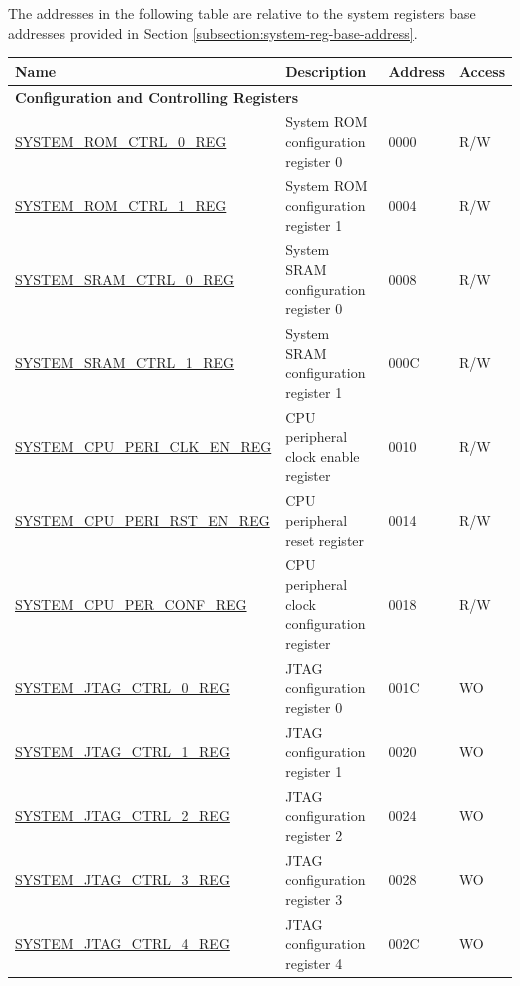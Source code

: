 The addresses in the following table are relative to the system registers base addresses provided in Section \ref{subsection:system-reg-base-address}.

\begin{longtable}{ | p{6.5cm} | p{7.5cm} | p{1.3cm} | p{1cm} | }
\hline\rowcolor{lightgray}
Name & Description &  Address & Access \\ \hline
\endhead
\multicolumn{4}{|l|}{\textbf{Configuration and Controlling Registers}} \\ \hline
\hyperref[regdesc:SYSTEMROMCTRL0REG]{SYSTEM\_ROM\_CTRL\_0\_REG} & System ROM configuration register 0 & \hexprefix{}0000 & R/W \\ \hline
\hyperref[regdesc:SYSTEMROMCTRL1REG]{SYSTEM\_ROM\_CTRL\_1\_REG} & System ROM configuration register 1 & \hexprefix{}0004 & R/W \\ \hline
\hyperref[regdesc:SYSTEMSRAMCTRL0REG]{SYSTEM\_SRAM\_CTRL\_0\_REG} & System SRAM configuration register 0 & \hexprefix{}0008 & R/W \\ \hline
\hyperref[regdesc:SYSTEMSRAMCTRL1REG]{SYSTEM\_SRAM\_CTRL\_1\_REG} & System SRAM configuration register 1 & \hexprefix{}000C & R/W \\ \hline
\hyperref[regdesc:SYSTEMCPUPERICLKENREG]{SYSTEM\_CPU\_PERI\_CLK\_EN\_REG} & CPU peripheral clock enable register & \hexprefix{}0010 & R/W \\ \hline
\hyperref[regdesc:SYSTEMCPUPERIRSTENREG]{SYSTEM\_CPU\_PERI\_RST\_EN\_REG} & CPU peripheral reset register & \hexprefix{}0014 & R/W \\ \hline
\hyperref[regdesc:SYSTEMCPUPERCONFREG]{SYSTEM\_CPU\_PER\_CONF\_REG} & CPU peripheral clock configuration register & \hexprefix{}0018 & R/W \\ \hline
\hyperref[regdesc:SYSTEMJTAGCTRL0REG]{SYSTEM\_JTAG\_CTRL\_0\_REG} & JTAG configuration register 0 & \hexprefix{}001C & WO \\ \hline
\hyperref[regdesc:SYSTEMJTAGCTRL1REG]{SYSTEM\_JTAG\_CTRL\_1\_REG} & JTAG configuration register 1 & \hexprefix{}0020 & WO \\ \hline
\hyperref[regdesc:SYSTEMJTAGCTRL2REG]{SYSTEM\_JTAG\_CTRL\_2\_REG} & JTAG configuration register 2 & \hexprefix{}0024 & WO \\ \hline
\hyperref[regdesc:SYSTEMJTAGCTRL3REG]{SYSTEM\_JTAG\_CTRL\_3\_REG} & JTAG configuration register 3 & \hexprefix{}0028 & WO \\ \hline
\hyperref[regdesc:SYSTEMJTAGCTRL4REG]{SYSTEM\_JTAG\_CTRL\_4\_REG} & JTAG configuration register 4 & \hexprefix{}002C & WO \\ \hline

\end{longtable}
